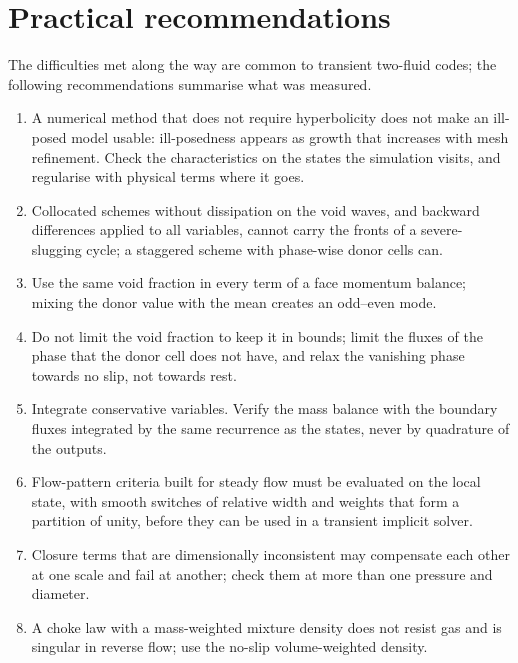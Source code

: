 \documentclass[a4paper,fleqn]{cas-sc}
\begin{document}
\begin{table}[htbp]
\caption{Signature of the gas-lift runs over their last \SI{4000}{\second}.}\label{tab:gaslift}
\footnotesize
\resizebox{\textwidth}{!}{}

\end{table}

\section{Practical recommendations}\label{sec:lessons}

The difficulties met along the way are common to transient two-fluid codes; the following recommendations summarise what was measured.
\begin{enumerate}
\item A numerical method that does not require hyperbolicity does not make an ill-posed model usable: ill-posedness appears as growth that increases with mesh refinement. Check the characteristics on the states the simulation visits, and regularise with physical terms where it goes.
\item Collocated schemes without dissipation on the void waves, and backward differences applied to all variables, cannot carry the fronts of a severe-slugging cycle; a staggered scheme with phase-wise donor cells can.
\item Use the same void fraction in every term of a face momentum balance; mixing the donor value with the mean creates an odd--even mode.
\item Do not limit the void fraction to keep it in bounds; limit the fluxes of the phase that the donor cell does not have, and relax the vanishing phase towards no slip, not towards rest.
\item Integrate conservative variables. Verify the mass balance with the boundary fluxes integrated by the same recurrence as the states, never by quadrature of the outputs.
\item Flow-pattern criteria built for steady flow must be evaluated on the local state, with smooth switches of relative width and weights that form a partition of unity, before they can be used in a transient implicit solver.
\item Closure terms that are dimensionally inconsistent may compensate each other at one scale and fail at another; check them at more than one pressure and diameter.
\item A choke law with a mass-weighted mixture density does not resist gas and is singular in reverse flow; use the no-slip volume-weighted density.

\end{enumerate}
\end{document}
